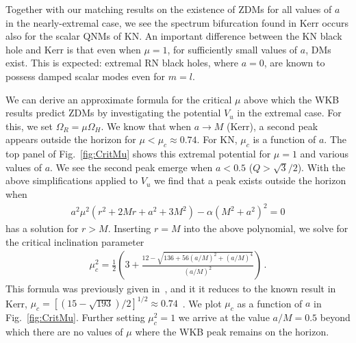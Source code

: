 \begin{refsection}
Together with our matching results on the existence of ZDMs for all values of $a$ in the nearly-extremal case, we see the spectrum bifurcation found in Kerr occurs also for the scalar QNMs of KN. 
An important difference between the KN black hole and Kerr is that even when $\mu = 1$, for sufficiently small values of $a$, DMs exist. 
This is expected: extremal RN black holes, where $a=0$, are known to possess damped scalar modes even for $m=l$.

We can derive an approximate formula for the critical $\mu$ above which the WKB results predict ZDMs by investigating the potential $V_u$ in the extremal case. For this, we set $\Omega_R = \mu \Omega_H$. We know that when $a \to M$ (Kerr), a second peak appears outside the horizon for $\mu < \mu_c \approx 0.74$. For KN, $\mu_c$ is a function of $a$. The top panel of Fig.~\ref{fig:CritMu} shows this extremal potential for $\mu =1$ and various values of $a$. We see the second peak emerge when $a < 0.5$ ($Q > \sqrt{3}/2$). With the above simplifications applied to $V_u$ we find that a peak exists outside the horizon when
\begin{align}
\label{eq:ExPoly}
a^2 \mu^2 (r^2 + 2Mr +a^2 +3M^2) - \alpha(M^2+a^2)^2 = 0
\end{align} 
has a solution for $r>M$. Inserting $r=M$ into the above polynomial, we solve for the critical inclination parameter
\begin{align}
\label{eq:MuCrit}
\mu_c^2 = \frac12 \left(3 + \frac{12 - \sqrt{136 +56(a/M)^2 +(a/M)^4}}{(a/M)^2} \right) \,.
\end{align}
This formula was previously given in~\cite{HodEikonal2012,Zhao:2015pqa}, and it it reduces to the known result in Kerr, $\mu_c = [(15 -\sqrt{193})/2]^{1/2}\approx0.74$~\cite{HodEikonal2012,Yang:2013uba}. We plot $\mu_c$ as a function of $a$ in Fig.~\ref{fig:CritMu}. Further setting $\mu_c^2 = 1$ we arrive at the value $a/M = 0.5$ beyond which there are no values of $\mu$ where the WKB peak remains on the horizon.


\end{refsection}
